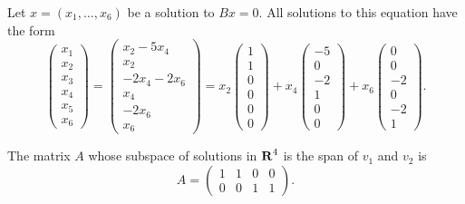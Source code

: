\documentclass{ximera}
\begin{document}
\soln Let $x = (x_1,\dots,x_6)$ be a solution to $Bx = 0$.  All solutions
to this equation have the form
\[
\left(\begin{array}{r} x_1 \\ x_2 \\ x_3 \\ x_4 \\ x_5 \\ x_6
\end{array}\right) =
\left(\begin{array}{c} x_2 - 5x_4 \\ x_2 \\ -2x_4 - 2x_6 \\ x_4 \\ -2x_6
\\ x_6 \end{array}\right) =
x_2\left(\begin{array}{r} 1 \\ 1 \\ 0 \\ 0 \\ 0 \\ 0 \end{array}\right) +
x_4\left(\begin{array}{r} -5 \\ 0 \\ -2 \\ 1 \\ 0 \\ 0 \end{array}\right) +
x_6\left(\begin{array}{r} 0 \\ 0 \\ -2 \\ 0 \\ -2 \\ 1 \end{array}\right).
\]


\ans The matrix $A$ whose subspace of solutions in $\mbox{$\bf{R}$}^4$ is the span of
$v_1$ and $v_2$ is
\[
A = \left(\begin{array}{rrrr} 1 & 1 & 0 & 0 \\ 0 & 0 & 1 & 1
\end{array}\right).
\]
\end{document}
